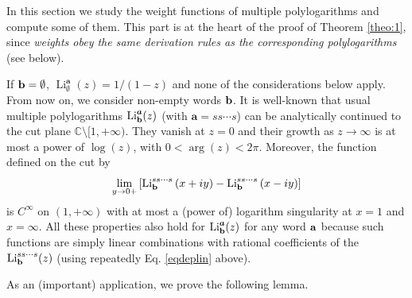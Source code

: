 \documentclass[reqno,12pt]{amsart}
\numberwithin{equation}{section}
\theoremstyle{remark}
\def\li{\operatorname{Li}}
\begin{document}
In this section we study the weight functions of multiple polylogarithms and compute some of them. 
This part is at the heart of the proof of Theorem \ref{theo:1}, since {\em weights obey the same 
derivation  rules as the corresponding polylogarithms} (see below).  

If ${\bf b}=\emptyset$, 
$\li_{\emptyset}^{\boldsymbol{a}}(z)=1/(1-z)$ and none of the considerations below apply. From now on, 
we consider non-empty words ${\bf b}$. 
It is well-known that  usual 
multiple polylogarithms $\li_{{\bf b}}^{\boldsymbol{a}}(z)$ (with $\boldsymbol{a}=ss\cdots s$) 
can be analytically continued to the cut plane $\mathbb C \setminus [1,+\infty)$. They vanish at $z=0$ and 
their growth as $z\to \infty$ is 
at most a power of $\log(z)$, with $0< \arg(z)< 2\pi$.  
Moreover, the function defined on the cut by
$$
\lim_{y\to 0+}
\left[\li_{{\bf b}}^{ss\cdots s}\left(x+iy\right)- 
\li_{{\bf b}}^{ss\cdots s}\left(x-iy\right)\right]
$$
is $C^{\infty}$ on $(1,+\infty)$ with at most a (power of) logarithm singularity at $x=1$ and $x=\infty$. All these 
properties also hold for $\li_{{\bf b}}^{\boldsymbol{a}}(z)$ for any word ${\bf a}$ because such functions are simply 
linear combinations with rational coefficients of the $\li_{{\bf b}}^{ss\cdots s}(z)$ (using repeatedly Eq. \eqref{eqdeplin} above).

As an (important) application, we prove the following lemma.
\end{document}
